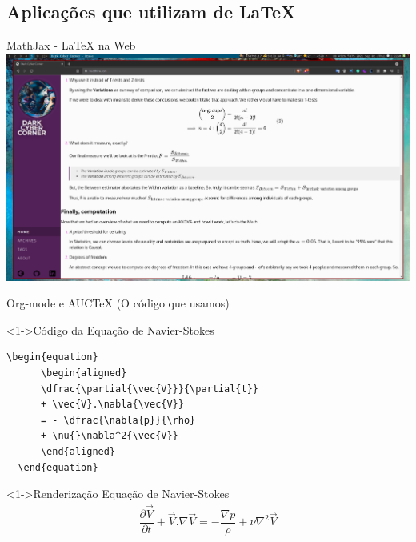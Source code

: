 \documentclass[bigger]{beamer}
\begin{document}
{\subsection{Aplicações que utilizam de \LaTeX{}}
\label{sec:orgd93d49b}
\begin{frame}[label={sec:org7b76984}]{MathJax - \LaTeX{} na Web}
\transdissolve
\href{img/mathjax.png}{\includegraphics[center,width=1.02\textwidth]{./img/mathjax.png}}
\end{frame}

\begin{frame}[label={sec:org4631a79},fragile]{Org-mode e AUCTeX (O código que usamos)}
 \begin{block}<1->{Código da Equação de Navier-Stokes}
\begin{verbatim}
\begin{equation}
	  \begin{aligned}
	  \dfrac{\partial{\vec{V}}}{\partial{t}}
	  + \vec{V}.\nabla{\vec{V}}
	  = - \dfrac{\nabla{p}}{\rho}
	  + \nu{}\nabla^2{\vec{V}}
	  \end{aligned}
  \end{equation}
\end{verbatim}

\transdissolve
\pause
\end{block}

\begin{block}<1->{Renderização Equação de Navier-Stokes}
\begin{equation}
        \begin{aligned}
        \dfrac{\partial{\vec{V}}}{\partial{t}} + \vec{V}.\nabla{\vec{V}} = - \dfrac{\nabla{p}}{\rho} + \nu{}\nabla^2{\vec{V}}
        \end{aligned}
\end{equation}
\end{block}
\end{frame}

}
\end{document}
